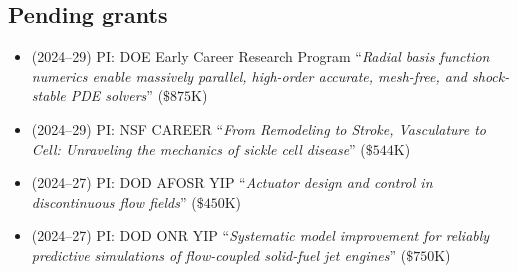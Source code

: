 \subsection{Pending grants}

\begin{itemize}
    \item (2024--29) PI: DOE Early Career Research Program ``\textit{Radial basis function numerics enable massively parallel, high-order accurate, mesh-free, and shock-stable PDE solvers}'' ($\$875$K)
    \item (2024--29) PI: NSF CAREER ``\textit{From Remodeling to Stroke, Vasculature to Cell: Unraveling the mechanics of sickle cell disease}'' ($\$544$K)
    \item (2024--27) PI: DOD AFOSR YIP ``\textit{Actuator design and control in discontinuous flow fields}'' ($\$450$K)
    \item (2024--27) PI: DOD ONR YIP ``\textit{Systematic model improvement for reliably predictive simulations of flow-coupled solid-fuel jet engines}'' ($\$750$K)
\end{itemize}
